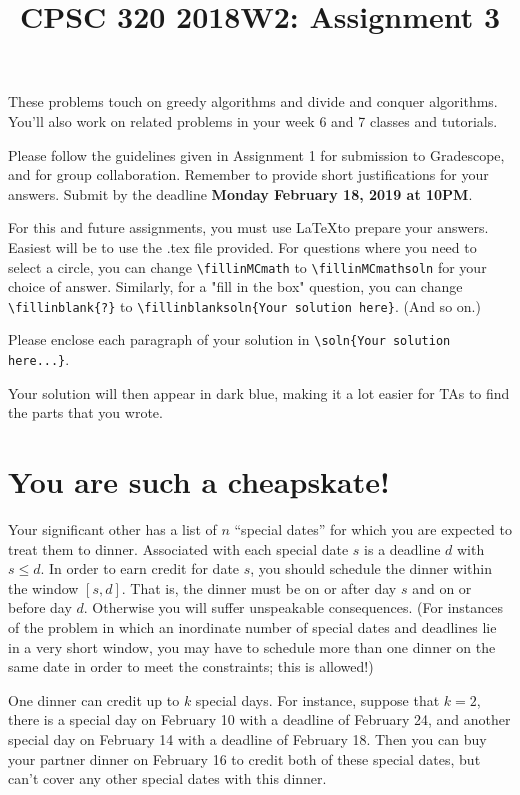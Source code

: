 \documentclass[11pt]{article}
\date{}
\title{CPSC 320 2018W2: Assignment 3}
\newcommand{\fillinMCmath}[1]{\begin{tikzpicture}\draw circle [radius=0.5em];\end{tikzpicture}\ #1}
\newcommand{\fillinMCmathsoln}[1]{\begin{tikzpicture}\draw[black, fill=blue] circle [radius=0.5em];\end{tikzpicture}\ #1}
\newcommand{\fillinblank}[1]{\fillinblankmath{\mbox{#1}}}
\newcommand{\fillinblankmath}[1]{\begingroup\setlength{\fboxsep}{1em}\setlength{\fboxrule}{2pt}\fbox{\LARGE\phantom{#1}}\endgroup}
\newcommand{\fillinblanksoln}[1]{\fillinblankmathsoln{\mbox{#1}}}
\newcommand{\fillinblankmathsoln}[1]{\begingroup\setlength{\fboxsep}{1em}\setlength{\fboxrule}{2pt}\fbox{{#1}}\endgroup}
\def\soln#1{\par\blu{#1}} %
\def\blu#1{{\color{blu}#1}}
\begin{document}
\maketitle
\vspace{-0.5in}

These problems touch on greedy algorithms and divide and conquer
algorithms. You'll also work on related problems
in your week 6 and 7 classes and tutorials.

Please follow the guidelines given in Assignment 1 for submission to
Gradescope, and for group collaboration. Remember to provide short
justifications for your answers. Submit by the deadline \textbf{Monday 
February 18, 2019 at 10PM}.

For this and future assignments, you must use \LaTeX to prepare your
answers. Easiest will be to use the .tex file provided. For questions
where you need to select a circle, you can change \verb~\fillinMCmath~ to
\verb~\fillinMCmathsoln~ for your choice of answer.  Similarly, for a "fill
in the box" question, you can change \verb~\fillinblank{?}~ to
\verb~\fillinblanksoln{Your solution here}~.  (And so on.)

Please enclose each paragraph
of your solution in \verb~\soln{Your solution here...}~.  
\soln{Your solution will then appear in dark blue}, making it a lot easier for
TAs to find the parts that you wrote.

\section{You are such a cheapskate!}
\label{sec-1}
Your significant other has a list of $n$ ``special
dates'' for which you are expected to treat them to dinner. Associated
with each special date $s$ is a deadline $d$ with $s \le d$.  In order
to earn credit for date $s$, you should schedule the dinner 
within the window $[s,d]$. That is, the dinner must be on or after day $s$
and on or before day $d$. Otherwise you will suffer unspeakable
consequences. (For instances of the problem in which an
inordinate number of special dates and deadlines lie in a very short
window, you may have to schedule more than one dinner on the same date
in order to meet the constraints; this is allowed!)

One dinner can credit up to $k$ special days. For instance, suppose
that $k=2$, there is a special day on February 10 with a deadline of
February 24, and another special day on February 14 with a deadline of
February 18. Then you can buy your partner dinner on February 16 to
credit both of these special dates, but can't cover any other special
dates with this dinner. 
\end{document}
